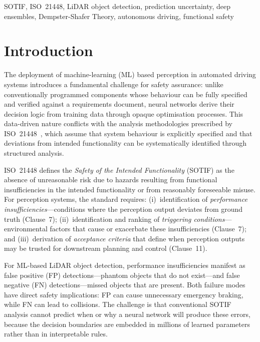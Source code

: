 \documentclass[conference]{IEEEtran}
\begin{document}
\begin{IEEEkeywords}
SOTIF, ISO~21448, LiDAR object detection, prediction uncertainty, deep ensembles, Dempster-Shafer Theory, autonomous driving, functional safety
\end{IEEEkeywords}


\section{Introduction}

The deployment of machine-learning (ML) based perception in automated driving systems introduces a fundamental challenge for safety assurance: unlike conventionally programmed components whose behaviour can be fully specified and verified against a requirements document, neural networks derive their decision logic from training data through opaque optimisation processes. This data-driven nature conflicts with the analysis methodologies prescribed by ISO~21448~\cite{iso21448}, which assume that system behaviour is explicitly specified and that deviations from intended functionality can be systematically identified through structured analysis.

ISO~21448 defines the \emph{Safety of the Intended Functionality} (SOTIF) as the absence of unreasonable risk due to hazards resulting from functional insufficiencies in the intended functionality or from reasonably foreseeable misuse. For perception systems, the standard requires: (i)~identification of \emph{performance insufficiencies}---conditions where the perception output deviates from ground truth (Clause~7); (ii)~identification and ranking of \emph{triggering conditions}---environmental factors that cause or exacerbate these insufficiencies (Clause~7); and (iii)~derivation of \emph{acceptance criteria} that define when perception outputs may be trusted for downstream planning and control (Clause~11).

For ML-based LiDAR object detection, performance insufficiencies manifest as false positive (FP) detections---phantom objects that do not exist---and false negative (FN) detections---missed objects that are present. Both failure modes have direct safety implications: FP can cause unnecessary emergency braking, while FN can lead to collisions. The challenge is that conventional SOTIF analysis cannot predict when or why a neural network will produce these errors, because the decision boundaries are embedded in millions of learned parameters rather than in interpretable rules.
\end{document}
